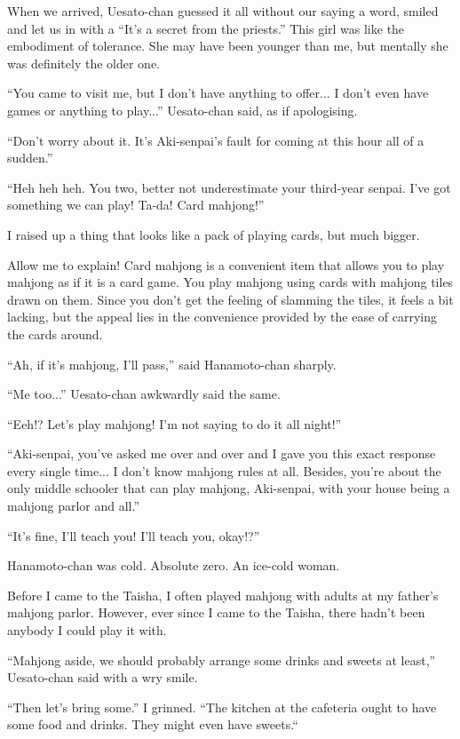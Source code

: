 When we arrived, Uesato-chan guessed it all without our saying a word, smiled and let us in with a ``It's a secret from the priests.'' This girl was like the embodiment of tolerance. She may have been younger than me, but mentally she was definitely the older one.

``You came to visit me, but I don't have anything to offer... I don't even have games or anything to play...'' Uesato-chan said, as if apologising.

``Don't worry about it. It's Aki-senpai's fault for coming at this hour all of a sudden.''

``Heh heh heh. You two, better not underestimate your third-year senpai. I've got something we can play! Ta-da! Card mahjong!''

I raised up a thing that looks like a pack of playing cards, but much bigger.

Allow me to explain! Card mahjong is a convenient item that allows you to play mahjong as if it is a card game. You play mahjong using cards with mahjong tiles drawn on them. Since you don't get the feeling of slamming the tiles, it feels a bit lacking, but the appeal lies in the convenience provided by the ease of carrying the cards around.

``Ah, if it's mahjong, I'll pass,'' said Hanamoto-chan sharply.

``Me too...'' Uesato-chan awkwardly said the same.

``Eeh!? Let's play mahjong! I'm not saying to do it all night!''

``Aki-senpai, you've asked me over and over and I gave you this exact response every single time... I don't know mahjong rules at all. Besides, you're about the only middle schooler that can play mahjong, Aki-senpai, with your house being a mahjong parlor and all.''

``It's fine, I'll teach you! I'll teach you, okay!?''

Hanamoto-chan was cold. Absolute zero. An ice-cold woman.

Before I came to the Taisha, I often played mahjong with adults at my father's mahjong parlor. However, ever since I came to the Taisha, there hadn't been anybody I could play it with.

``Mahjong aside, we should probably arrange some drinks and sweets at least,'' Uesato-chan said with a wry smile.

``Then let's bring some.'' I grinned. ``The kitchen at the cafeteria ought to have some food and drinks. They might even have sweets.``

